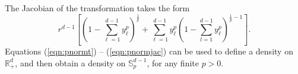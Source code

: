   The Jacobian of the transformation takes the form
  \begin{equation}
    \label{eqn:pnormjac}
    r^{d-1}\left[\left(1 - {\textstyle\sum}_{\ell = 1}^{d-1}y_{\ell}^p\right)^{\frac{1}{p}} +
        {\textstyle\sum}_{\ell = 1}^{d-1}y_{\ell}^p\left(1 - {\textstyle\sum}_{l=1}^{d-1} y_{\ell}^p\right)^{\frac{1}{p} - 1}\right].
  \end{equation}
  Equations (\ref{eqn:pnormt}) -- (\ref{eqn:pnormjac}) can be used to define a density on ${\mathbb R}^d_+$, and then obtain a density on ${\mathbb S}_{p}^{d-1}$, for any finite $p>0$. 
  
